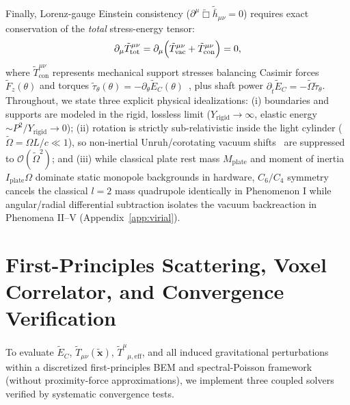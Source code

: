 \documentclass[aps,prd,twocolumn,10pt,showkeys,nofootinbib,floatfix,longbibliography]{revtex4-2}
\begin{document}
Finally, Lorenz-gauge Einstein consistency ($\partial^\mu \tilde{\Box}\tilde{\bar{h}}_{\mu\nu} = 0$) requires exact conservation of the \emph{total} stress-energy tensor:
\begin{equation}
\partial_\mu \tilde{T}^{\mu\nu}_{\mathrm{tot}} = \partial_\mu \Bigl( \tilde{T}^{\mu\nu}_{\mathrm{vac}} + \tilde{T}^{\mu\nu}_{\mathrm{con}} \Bigr) = 0,
\label{eq:covariant_conservation}
\end{equation}
where $\tilde{T}^{\mu\nu}_{\mathrm{con}}$ represents mechanical support stresses balancing Casimir forces $\tilde{F}_z(\theta)$ and torques $\tilde{\tau}_\theta(\theta) = -\partial_\theta \tilde{E}_C(\theta)$~\cite{fulling2007,milton2014fall,sorge2021buoyancy}, plus shaft power $\partial_{\tilde{t}}\tilde{E}_C = -\tilde{\Omega}\tilde{\tau}_\theta$. Throughout, we state three explicit physical idealizations: (i) boundaries and supports are modeled in the rigid, lossless limit ($Y_{\mathrm{rigid}} \to \infty$, elastic energy $\sim P^2/Y_{\mathrm{rigid}} \to 0$); (ii) rotation is strictly sub-relativistic inside the light cylinder ($\tilde{\Omega} = \Omega L/c \ll 1$), so non-inertial Unruh/corotating vacuum shifts~\cite{chernodub2013prd,schaden2012arxiv,flachi2023prd} are suppressed to $\mathcal{O}(\tilde{\Omega}^2)$; and (iii) while classical plate rest mass $M_{\mathrm{plate}}$ and moment of inertia $I_{\mathrm{plate}}\Omega$ dominate static monopole backgrounds in hardware, $C_6/C_4$ symmetry cancels the classical $l=2$ mass quadrupole identically in Phenomenon I while angular/radial differential subtraction isolates the vacuum backreaction in Phenomena II--V (Appendix~\ref{app:virial}).

\section{First-Principles Scattering, Voxel Correlator, and Convergence Verification}
\label{sec:methods}

To evaluate $\tilde{E}_C$, $\tilde{T}_{\mu\nu}(\tilde{\mathbf{x}})$, $\tilde{T}^\mu{}_{\mu,\mathrm{eff}}$, and all induced gravitational perturbations within a discretized first-principles BEM and spectral-Poisson framework (without proximity-force approximations), we implement three coupled solvers verified by systematic convergence tests.
\end{document}
